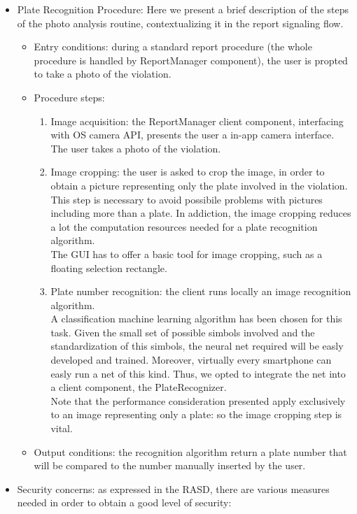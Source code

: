 \begin{itemize}
	\item Plate Recognition Procedure: Here we present a brief description of the steps of the photo analysis routine, contextualizing it in the report signaling flow.
	\begin{itemize}
		\item Entry conditions: during a standard report procedure (the whole procedure is handled by ReportManager component), the user is propted to take a photo of the violation.
		\item  Procedure steps:
	\begin{enumerate}
		\item Image acquisition: the ReportManager client component, interfacing with OS camera API, presents the user a in-app camera interface. The user takes a photo of the violation.
		\item Image cropping: the user is asked to crop the image, in order to obtain a picture representing only the plate involved in the violation. This step is necessary to avoid possibile problems with pictures including more than a plate. In addiction, the image cropping reduces a lot the computation resources needed for a plate recognition algorithm.\\
		The GUI has to offer a basic tool for image cropping, such as a floating selection rectangle.
		\item Plate number recognition:  the client runs locally an image recognition algorithm. \\
		A classification machine learning algorithm has been chosen for this task. Given the small set of possible simbols involved and the standardization of this simbols, the neural net required will be easly developed and trained. Moreover, virtually every smartphone can easly run a net of this kind. Thus, we opted to integrate the net into a client component, the PlateRecognizer.\\
		Note that the performance consideration presented apply exclusively to an image representing only a plate: so the image cropping step is vital.
	\end{enumerate}
	\item Output conditions: the recognition algorithm return a plate number that will be compared to the number manually inserted by the user.
	\end{itemize}
	\item Security concerns: as expressed in the RASD, there are various measures needed in order to obtain a good level of security:

\end{itemize}
